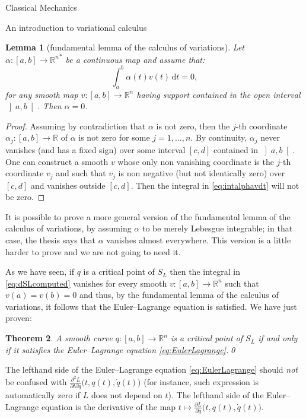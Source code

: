 \documentclass[oneside,a4paper,11pt]{amsbook}
\newcommand{\R}{\mathds R}
\newcommand{\dd}{\mathrm d}
\theoremstyle{remark}\newtheorem{exercise}{Exercise}[chapter]
\theoremstyle{plain}\newtheorem{teo}{Theorem}[section]
\theoremstyle{plain}\newtheorem{lem}[teo]{Lemma}
\theoremstyle{plain}\newtheorem{prop}[teo]{Proposition}
\theoremstyle{plain}\newtheorem{cor}[teo]{Corollary}
\theoremstyle{definition}\newtheorem{defin}[teo]{Definition}
\theoremstyle{remark}\newtheorem{rem}[teo]{Remark}
\theoremstyle{definition}\newtheorem{notation}[teo]{Notation}
\theoremstyle{definition}\newtheorem{convention}[teo]{Convention}
\theoremstyle{definition}\newtheorem{example}[teo]{Example}
\numberwithin{section}{chapter}
\numberwithin{equation}{section}
\begin{document}
\begin{chapter}{Classical Mechanics}
\begin{section}{An introduction to variational calculus}
\begin{lem}[fundamental lemma of the calculus of variations]
Let $\alpha:[a,b]\to{\R^n}^*$ be a continuous map and assume that:
\begin{equation}\label{eq:intalphavdt}
\int_a^b\alpha(t)v(t)\,\dd t=0,
\end{equation}
for any smooth map $v:[a,b]\to\R^n$ having support contained in the open interval $\left]a,b\right[$.
Then $\alpha=0$.
\end{lem}
\begin{proof}
Assuming by contradiction that $\alpha$ is not zero, then the $j$-th coordinate
$\alpha_j:[a,b]\to\R$ of $\alpha$ is not zero for some $j=1,\ldots,n$. By continuity, $\alpha_j$ never vanishes
(and has a fixed sign) over some interval $[c,d]$ contained in $\left]a,b\right[$. One can construct
a smooth $v$ whose only non vanishing coordinate is the $j$-th coordinate $v_j$ and such that $v_j$ is non negative
(but not identically zero) over $[c,d]$ and vanishes outside $[c,d]$. Then the integral in
\eqref{eq:intalphavdt} will not be zero.
\end{proof}
It is possible to prove a more general version of the fundamental lemma of the calculus of variations, by assuming
$\alpha$ to be merely Lebesgue integrable; in that case, the thesis says that $\alpha$ vanishes almost everywhere.
This version is a little harder to prove and we are not going to need it.

As we have seen, if $q$ is a critical point of $S_L$ then the integral in \eqref{eq:dSLcomputed} vanishes
for every smooth $v:[a,b]\to\R^n$ such that $v(a)=v(b)=0$ and thus, by the fundamental lemma of the calculus
of variations, it follows that the Euler--Lagrange equation is satisfied. We have just proven:

\begin{teo}\label{thm:teoEL}
A smooth curve $q:[a,b]\to\R^n$ is a critical point of $S_L$ if and only if it satisfies the Euler--Lagrange
equation \eqref{eq:EulerLagrange}.\qed
\end{teo}

The lefthand side of the Euler--Lagrange equation \eqref{eq:EulerLagrange} should {\em not\/} be confused with
$\frac{\partial^2L}{\partial t\partial\dot q}\big(t,q(t),\dot q(t)\big)$ (for instance, such expression is automatically
zero if $L$ does not depend on $t$). The lefthand side of the Euler--Lagrange equation is the derivative
of the map $t\mapsto\frac{\partial L}{\partial\dot q}\big(t,q(t),\dot q(t)\big)$.


\end{section}
\end{chapter}
\end{document}
